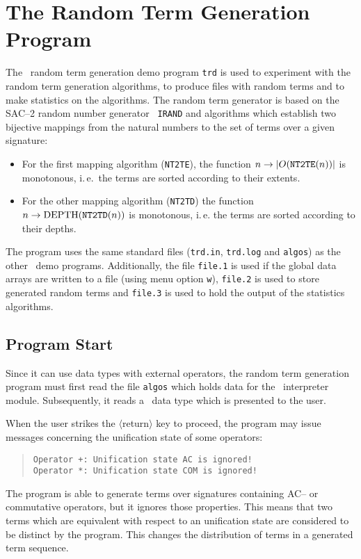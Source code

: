 \section{The Random Term Generation Program}
The \redux\ random term generation demo program {\tt trd} is used to
experiment with the random term generation algorithms, to produce files
with random terms and to make statistics on the algorithms. The random
term generator is based on the SAC--2 random number generator {\tt
IRAND} and algorithms which establish two bijective mappings from the
natural numbers to the set of terms over a given signature:
\begin{itemize}
\item For the first mapping algorithm ({\tt NT2TE}), the function
   \(n \rightarrow |O(\mbox{\tt NT2TE}(n))|\) is monotonous,
   i.\,e.\ the terms are sorted according to their extents.
\item For the other mapping algorithm ({\tt NT2TD}) the function
   \(n \rightarrow \mbox{DEPTH}(\mbox{\tt NT2TD}(n))\) is monotonous,
   i.\,e. the terms are sorted according to their depths.
\end{itemize}

The program uses the same standard files ({\tt trd.in}, {\tt trd.log}
and {\tt algos}) as the other \redux\ demo programs. Additionally, the
file {\tt file.1} is used if the global data arrays are written to a
file (using menu option {\tt w}), {\tt file.2} is used to store
generated random terms and {\tt file.3} is used to hold the output of
the statistics algorithms.

\subsection{Program Start}
Since it can use data types with external operators, the random term
generation program must first read the file {\tt algos} which holds data for
the \redux\ interpreter module.  Subsequently, it reads a \redux\ data type
which is presented to the user.

When the user strikes the $\langle$return$\rangle$ key to proceed, the program
may issue messages concerning the unification state of some
operators:
\begin{quote}
\begin{verbatim}
Operator +: Unification state AC is ignored!
Operator *: Unification state COM is ignored!
\end{verbatim}
\end{quote}
The program is able to generate terms over signatures containing AC--
or commutative operators, but it ignores those properties.  This means
that two terms which are equivalent with respect to an unification
state are considered to be distinct by the program. This changes
the distribution of terms in a generated term sequence.

